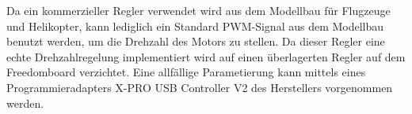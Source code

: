 Da ein kommerzieller Regler verwendet wird aus dem Modellbau für
Flugzeuge und Helikopter, kann lediglich ein Standard PWM-Signal
aus dem Modellbau benutzt werden, um die Drehzahl des Motors zu
stellen. Da dieser Regler eine echte Drehzahlregelung implementiert
wird auf einen überlagerten Regler auf dem Freedomboard verzichtet.
Eine allfällige Parametierung kann mittels eines Programmieradapters
X-PRO USB Controller V2 des Herstellers vorgenommen werden.
